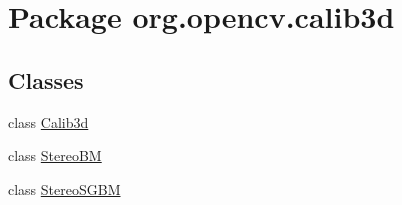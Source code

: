 \hypertarget{namespaceorg_1_1opencv_1_1calib3d}{}\section{Package org.\+opencv.\+calib3d}
\label{namespaceorg_1_1opencv_1_1calib3d}
\subsection*{Classes}
\begin{DoxyCompactItemize}
\item 
class \mbox{\hyperlink{classorg_1_1opencv_1_1calib3d_1_1_calib3d}{Calib3d}}
\item 
class \mbox{\hyperlink{classorg_1_1opencv_1_1calib3d_1_1_stereo_b_m}{Stereo\+BM}}
\item 
class \mbox{\hyperlink{classorg_1_1opencv_1_1calib3d_1_1_stereo_s_g_b_m}{Stereo\+S\+G\+BM}}
\end{DoxyCompactItemize}
